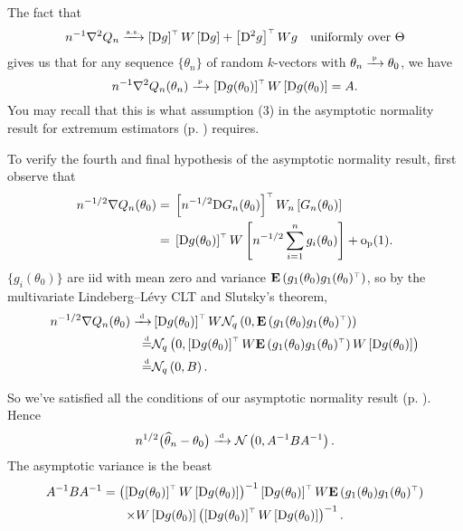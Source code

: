 \documentclass[11pt,letterpaper,reqno,oneside]{article}
\begin{document}
The fact that
%
\begin{equation*}
	n^{-1} \nabla^2 Q_n 
	\xrightarrow{{\scriptscriptstyle \mathrm{a.s.}}} \left[ \mathrm{D} g \right]^{\scriptscriptstyle \top} W \left[ \mathrm{D} g \right] 
	+ \left[ \mathrm{D}^2 g \right]^{\scriptscriptstyle \top} W g
	\quad\text{uniformly over $\Theta$}
\end{equation*}
%
gives us that for any sequence $\{ \theta_n \}$ of random $k$-vectors with $\theta_n \xrightarrow{{\scriptscriptstyle \mathrm{\;p\;}}} \theta_0$, we have
%
\begin{equation*}
	n^{-1} \nabla^2 Q_n(\theta_n)
	\xrightarrow{{\scriptscriptstyle \mathrm{\;p\;}}} \left[ \mathrm{D} g(\theta_0) \right]^{\scriptscriptstyle \top} W \left[ \mathrm{D} g(\theta_0) \right]
	= A .
\end{equation*}
%
You may recall that this is what assumption (3) in the asymptotic normality result for extremum estimators (p. \pageref{proposition:asymptotic_normality}) requires.

To verify the fourth and final hypothesis of the asymptotic normality result, first observe that
%
\begin{align*}
	n^{-1/2} \nabla Q_n(\theta_0) 
	={}& \left[ n^{-1/2} \mathrm{D} G_n(\theta_0) \right]^{\scriptscriptstyle \top} 
	W_n \left[ G_n(\theta_0) \right] 
	\\
	={}& \left[ \mathrm{D} g(\theta_0) \right]^{\scriptscriptstyle \top} 
	W \left[ n^{-1/2} \sum_{i=1}^n g_i(\theta_0) \right] + \mathrm{o}_{\mathrm{p}}(1) .
\end{align*}
%
$\{ g_i(\theta_0) \}$ are iid with mean zero and variance $\mathbf{E}\left( g_1(\theta_0) g_1(\theta_0)^{\scriptscriptstyle \top} \right)$, so by the multivariate Lindeberg--Lévy CLT and Slutsky's theorem,
%
\begin{align*}
	n^{-1/2} \nabla Q_n(\theta_0) 
	\xrightarrow{{\scriptscriptstyle \mathrm{\;d\;}}}& \left[ \mathrm{D} g(\theta_0) \right]^{\scriptscriptstyle \top} 
	W \mathcal{N}_q\left( 0, \mathbf{E}\left( g_1(\theta_0) g_1(\theta_0)^{\scriptscriptstyle \top} \right) \right)
	\\
	\protect\overset{{\scriptscriptstyle \mathrm{d}}}{=}& \mathcal{N}_q\left( 0, 
	\left[ \mathrm{D} g(\theta_0) \right]^{\scriptscriptstyle \top} W
	\mathbf{E}\left( g_1(\theta_0) g_1(\theta_0)^{\scriptscriptstyle \top} \right)
	W \left[ \mathrm{D} g(\theta_0) \right]
	\right)
	\\
	\protect\overset{{\scriptscriptstyle \mathrm{d}}}{=}& \mathcal{N}_q\left( 0, B \right) .
\end{align*}


So we've satisfied all the conditions of our asymptotic normality result (p. \pageref{proposition:asymptotic_normality}). Hence
%
\begin{equation*}
	n^{1/2} \bigl( \widehat{\theta}_n - \theta_0 \bigr)
	\xrightarrow{{\scriptscriptstyle \mathrm{\;d\;}}} \mathcal{N}\left( 0, A^{-1} B A^{-1} \right) .
\end{equation*}
%
The asymptotic variance is the beast
%
\begin{multline*}
	A^{-1} B A^{-1}
	= 
	\left( \left[ \mathrm{D} g(\theta_0) \right]^{\scriptscriptstyle \top} W \left[ \mathrm{D} g(\theta_0) \right] \right)^{-1}
	\left[ \mathrm{D} g(\theta_0) \right]^{\scriptscriptstyle \top} W 
	\mathbf{E}\left( g_1(\theta_0) g_1(\theta_0)^{\scriptscriptstyle \top} \right)
	\\ \times
	W \left[ \mathrm{D} g(\theta_0) \right]
	\left( \left[ \mathrm{D} g(\theta_0) \right]^{\scriptscriptstyle \top} W \left[ \mathrm{D} g(\theta_0) \right] \right)^{-1} .
\end{multline*}
\end{document}
